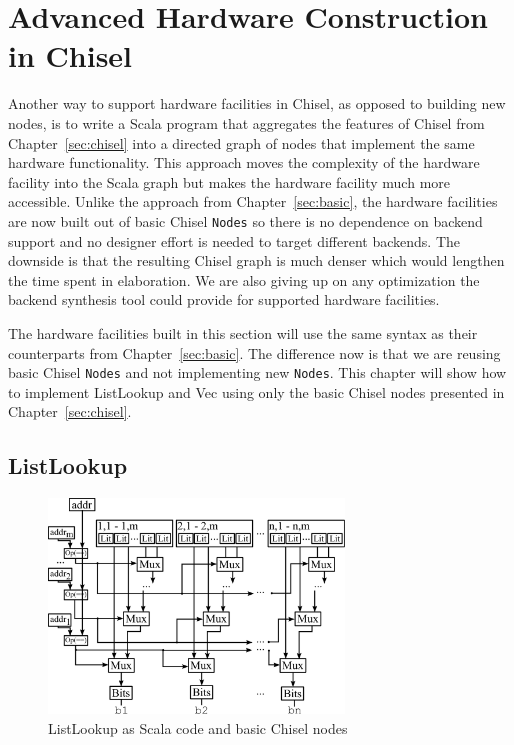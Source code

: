 \section{Advanced Hardware Construction in Chisel}
\label{sec:advanced}
Another way to support hardware facilities in Chisel, as opposed to
building new nodes, is to write a Scala program that aggregates the
features of Chisel from Chapter~\ref{sec:chisel} into a directed graph
of nodes that implement the same hardware functionality. This approach
moves the complexity of the hardware facility into the Scala graph but
makes the hardware facility much more accessible.
Unlike the approach from Chapter~\ref{sec:basic}, the
hardware facilities are now built out of basic Chisel {\tt Nodes} so
there is no dependence on backend support and no designer effort is
needed to target different backends. The downside is that the
resulting Chisel graph is much denser which would lengthen the time
spent in elaboration. We are also giving up on any optimization the
backend synthesis tool could provide for supported hardware facilities.

The hardware facilities built in this section will use the same syntax
as their counterparts from Chapter~\ref{sec:basic}. The difference now
is that we are reusing basic Chisel {\tt Nodes} and not implementing
new {\tt Nodes}. This chapter will show how to implement ListLookup
and Vec using only the basic Chisel nodes presented in
Chapter~\ref{sec:chisel}.

\subsection{ListLookup}
\begin{figure}[htb]
\centering
\includegraphics[width=0.7\textwidth]{figures/listlookupscala.pdf}
\caption{ListLookup as Scala code and basic Chisel nodes}
\label{fig:llscala}
\end{figure}


